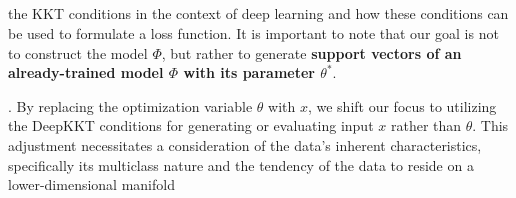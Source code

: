 \subsection{}
\label{sec:DKKTcondition}

 the KKT conditions in the context of deep learning and how these conditions can be used to formulate a loss function. It is important to note that our goal is not to construct the model $\Phi$, but rather to generate \textbf{support vectors of an already-trained model $\Phi$ with its parameter $\theta^*$}.

.
By replacing the optimization variable $\theta$ with $x$, we shift our focus to utilizing the DeepKKT conditions for generating or evaluating input $x$ rather than $\theta$. This adjustment necessitates a consideration of the data's inherent characteristics, specifically its multiclass nature and the tendency of the data to reside on a lower-dimensional manifold  %


